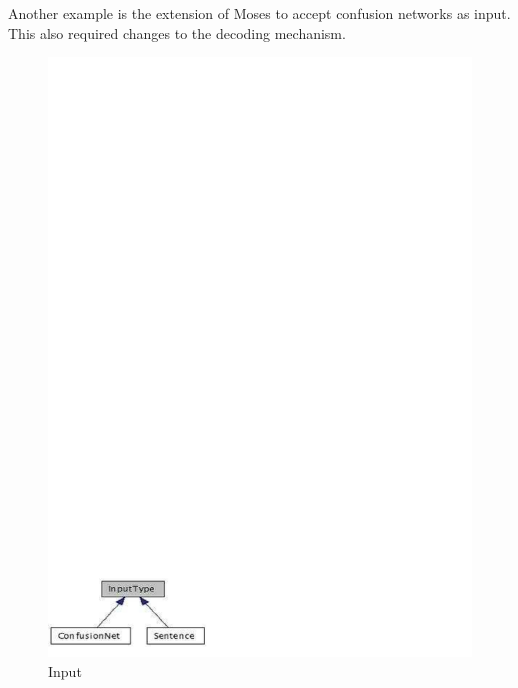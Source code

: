 \documentclass[11pt]{book}
\theoremstyle{plain}
\begin{document}
Another example is the extension of Moses to accept confusion networks as input. This also required changes to the decoding mechanism.\\

\begin{figure}[h]
\centering
\includegraphics[scale=0.2]{hieu-3}
\caption{Input}
\end{figure}
\end{document}
